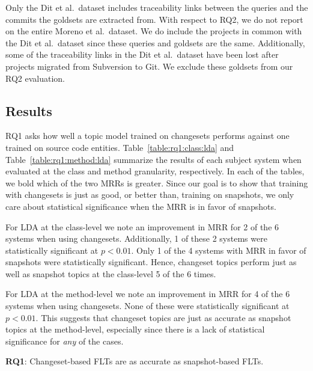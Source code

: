 Only the Dit et al.\ dataset includes traceability links between
the queries and the commits the goldsets are extracted from.
With respect to RQ2, we do not report on the entire Moreno et al.\ dataset.
We do include the projects in common with the Dit et al.\ dataset
since these queries and goldsets are the same.
Additionally, some of the traceability links in the Dit et al.\ dataset
have been lost after projects migrated from Subversion to Git.
We exclude these goldsets from our RQ2 evaluation.



\subsection{Results}




RQ1 asks how well a topic model trained on changesets performs against
one trained on source code entities.
Table~\ref{table:rq1:class:lda} and Table~\ref{table:rq1:method:lda}
summarize the results of each subject system when
evaluated at the class and method granularity, respectively.
In each of the tables, we bold which of the two MRRs is greater.
Since our goal is to show that training with changesets is just as good, or
better than, training on snapshots, we only care about statistical significance
when the MRR is in favor of snapshots.

For LDA at the class-level we note an improvement in MRR for 2 of the 6 systems when using changesets.
Additionally, 1 of these 2 systems were statistically significant at $p<0.01$.
Only 1 of the 4 systems with MRR in favor of snapshots were statistically significant.
Hence, changeset topics perform just as well as snapshot topics at the class-level 5 of the 6 times.

For LDA at the method-level we note an improvement in MRR for 4 of the 6 systems when using changesets.
None of these were statistically significant at $p<0.01$.
This suggests that changeset topics are just as accurate as snapshot topics at the method-level,
especially since there is a lack of statistical significance for \emph{any} of the cases.

\begin{framed}
    \textbf{RQ1}:
    Changeset-based FLTs are as accurate as snapshot-based FLTs.
\end{framed}



